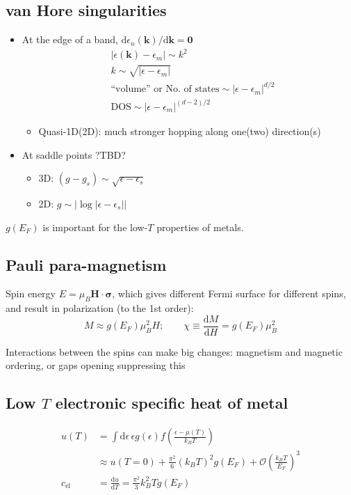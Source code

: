 \documentclass[11pt,letterpaper]{article}
\numberwithin{equation}{section} %
\renewcommand*{\vec}[1]{\bm{#1}}
\newcommand{\dif}{\mathrm d}
\begin{document}
\subsection{van Hore singularities}
\label{sub:van Hore singularities}
\begin{itemize}
  \item At the edge of a band, $\dif\epsilon_n(\vec k)/\dif\vec k = \vec 0$
	  \begin{align} &|\epsilon(\vec k) -\epsilon_m|\sim k^2 \\
					&k\sim\sqrt{|\epsilon-\epsilon_m|} \\ &\mbox{``volume''
		  or No. of states} \sim |\epsilon - \epsilon_m|^{d/2} \\
	  &\mbox{DOS}\sim |\epsilon - \epsilon_m|^{(d-2)/2} 
	  \end{align}
	  \begin{itemize}
		  \item Quasi-1D(2D): much stronger hopping along one(two)
			  direction(s)
	  \end{itemize}
  \item At saddle points ?TBD?
	  \begin{itemize}
		  \item 3D: $(g-g_s)\sim\sqrt{\epsilon - \epsilon_s}$
		  \item 2D: $g\sim|\log|\epsilon -\epsilon_s||$
	  \end{itemize}
\end{itemize}
$g(E_F)$ is important for the low-$T$ properties of metals.

\subsection{Pauli para-magnetism}
\label{sub:pauli_paramagnetism}
Spin energy $E = \mu_B \vec H\cdot\vec\sigma$, which gives different Fermi
surface for different spins, and result in polarization (to the 1st order): 
\begin{equation}
	M \approx g(E_F)\mu_B^2 H; \qquad 
	\chi \equiv \frac{\dif M}{\dif H} = g(E_F)\mu_B^2
\end{equation}

Interactions between the spins can make big changes: magnetism and magnetic
ordering, or gaps opening suppressing this

\subsection[Low T electronic specific heat of metal]{Low $T$ electronic specific heat of metal}
\label{sub:low_t_electronic_specific_heat_of_metal}
\begin{align}
	u(T) &= \int\dif\epsilon\, \epsilon g(\epsilon)f\left(
	\frac{\epsilon - \mu(T)}{k_B T}\right) \\
	&\approx u(T=0) + \frac{\pi^2}{6}(k_BT)^2g(E_F) + 
	\mathcal O\left(\frac{k_BT}{E_F}\right)^3 \\
	c_{\mbox{el}} &= \frac{\dif u}{\dif T} = \frac{\pi^2}{3} k_B^2 T g(E_F)
\end{align}
\end{document}
